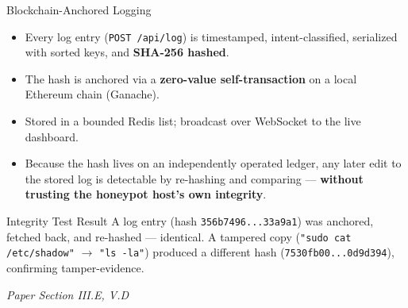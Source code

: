 \documentclass[aspectratio=169, 11pt]{beamer}
\newcommand{\srcnote}[1]{{\footnotesize\color{gray}\textit{#1}}}
\begin{document}
\begin{frame}{Blockchain-Anchored Logging}
    \begin{itemize}
        \item Every log entry (\texttt{POST /api/log}) is timestamped, intent-classified, serialized with sorted keys, and \textbf{SHA-256 hashed}.
        \item The hash is anchored via a \textbf{zero-value self-transaction} on a local Ethereum chain (Ganache).
        \item Stored in a bounded Redis list; broadcast over WebSocket to the live dashboard.
        \item Because the hash lives on an independently operated ledger, any later edit to the stored log is detectable by re-hashing and comparing --- \textbf{without trusting the honeypot host's own integrity}.
    \end{itemize}
    \vspace{3mm}
    \begin{block}{\small Integrity Test Result}
        \small A log entry (hash \texttt{356b7496...33a9a1}) was anchored, fetched back, and re-hashed --- identical. A tampered copy (\texttt{"sudo cat /etc/shadow"} $\to$ \texttt{"ls -la"}) produced a different hash (\texttt{7530fb00...0d9d394}), confirming tamper-evidence.
    \end{block}
    \srcnote{Paper Section III.E, V.D}
\end{frame}

\end{document}
